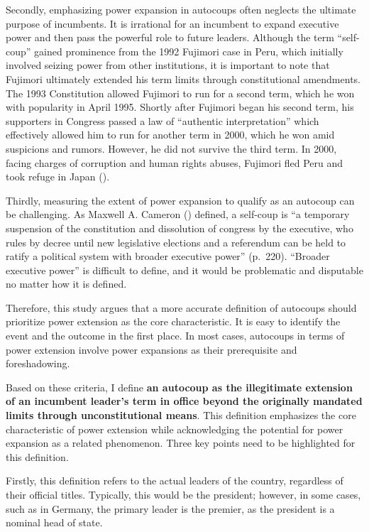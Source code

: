 \documentclass[
  12pt,
]{report}
\begin{document}
Secondly, emphasizing power expansion in autocoups often neglects the
ultimate purpose of incumbents. It is irrational for an incumbent to
expand executive power and then pass the powerful role to future
leaders. Although the term ``self-coup'' gained prominence from the 1992
Fujimori case in Peru, which initially involved seizing power from other
institutions, it is important to note that Fujimori ultimately extended
his term limits through constitutional amendments. The 1993 Constitution
allowed Fujimori to run for a second term, which he won with popularity
in April 1995. Shortly after Fujimori began his second term, his
supporters in Congress passed a law of ``authentic interpretation''
which effectively allowed him to run for another term in 2000, which he
won amid suspicions and rumors. However, he did not survive the third
term. In 2000, facing charges of corruption and human rights abuses,
Fujimori fled Peru and took refuge in Japan
().

Thirdly, measuring the extent of power expansion to qualify as an
autocoup can be challenging. As Maxwell A. Cameron
() defined, a self-coup is ``a
temporary suspension of the constitution and dissolution of congress by
the executive, who rules by decree until new legislative elections and a
referendum can be held to ratify a political system with broader
executive power'' (p.~220). ``Broader executive power'' is difficult to
define, and it would be problematic and disputable no matter how it is
defined.

Therefore, this study argues that a more accurate definition of
autocoups should prioritize power extension as the core characteristic.
It is easy to identify the event and the outcome in the first place. In
most cases, autocoups in terms of power extension involve power
expansions as their prerequisite and foreshadowing.

Based on these criteria, I define \textbf{an autocoup as the
illegitimate extension of an incumbent leader's term in office beyond
the originally mandated limits through unconstitutional means}. This
definition emphasizes the core characteristic of power extension while
acknowledging the potential for power expansion as a related phenomenon.
Three key points need to be highlighted for this definition.

Firstly, this definition refers to the actual leaders of the country,
regardless of their official titles. Typically, this would be the
president; however, in some cases, such as in Germany, the primary
leader is the premier, as the president is a nominal head of state.
\end{document}
